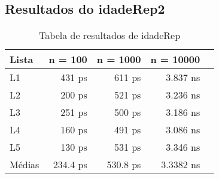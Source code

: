 \subsection{Resultados do idadeRep2}

\begin{table}[h!]
	\centering
	\caption{Tabela de resultados de idadeRep}
	\label{tab:idade_rep_result}
	\begin{tabular}{lrrrr}
		\toprule
		Lista   & n = 100   & n = 1000  & n = 10000 \\
		\midrule
		L1      & 431 ps    & 611 ps    & 3.837 ns  \\
		L2      & 200 ps    & 521 ps    & 3.236 ns  \\
		L3      & 251 ps    & 500 ps    & 3.186 ns  \\
		L4      & 160 ps    & 491 ps    & 3.086 ns  \\
		L5      & 130 ps    & 531 ps    & 3.346 ns  \\
		\midrule
		Médias  & 234.4 ps  & 530.8 ps  & 3.3382 ns \\
		\bottomrule
	\end{tabular}
\end{table}


